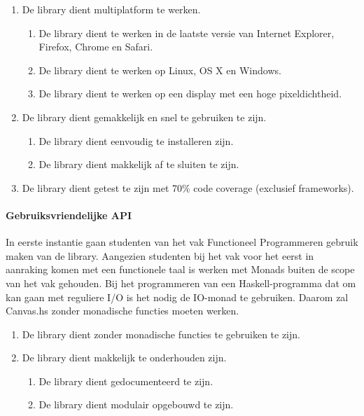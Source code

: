\begin{enumerate}[label={R\arabic*}]
\setcounter{enumi}{\value{startvalue}}
	\item \label{req:multiplatform} De library dient multiplatform te werken.
	\begin{enumerate}[label={R\arabic{enumi}.\arabic*}]
		\item De library dient te werken in de laatste versie van Internet Explorer, Firefox, Chrome en Safari.
		\item De library dient te werken op Linux, OS X en Windows.
		\item De library dient te werken op een display met een hoge pixeldichtheid.
	\end{enumerate}
	\item \label{req:performance} De library dient gemakkelijk en snel te gebruiken te zijn.
	\begin{enumerate}[label={R\arabic{enumi}.\arabic*}]
		\item De library dient eenvoudig te installeren zijn.
		\item De library dient makkelijk af te sluiten te zijn.
	\end{enumerate}
	\item \label{req:coverage} De library dient getest te zijn met 70\% code coverage (exclusief frameworks).
	\setcounter{startvalue}{\value{enumi}}
\end{enumerate}

\paragraph{Gebruiksvriendelijke API}
In eerste instantie gaan studenten van het vak Functioneel Programmeren gebruik maken van de library. Aangezien studenten bij het vak voor het eerst in aanraking komen met een functionele taal is werken met Monads buiten de scope van het vak gehouden. Bij het programmeren van een Haskell-programma dat om kan gaan met reguliere I/O is het nodig de IO-monad te gebruiken. Daarom zal Canvas.hs zonder monadische functies moeten werken.

\begin{enumerate}[label={R\arabic*}]
\setcounter{enumi}{\value{startvalue}}
		\item \label{req:monadisch} De library dient zonder monadische functies te gebruiken te zijn.
		\item \label{req:maintenance} De library dient makkelijk te onderhouden zijn.
		\begin{enumerate}[label={R\arabic{enumi}.\arabic*}]
			\item De library dient gedocumenteerd te zijn.
			\item De library dient modulair opgebouwd te zijn.
		\end{enumerate}
	\setcounter{startvalue}{\value{enumi}}
\end{enumerate}